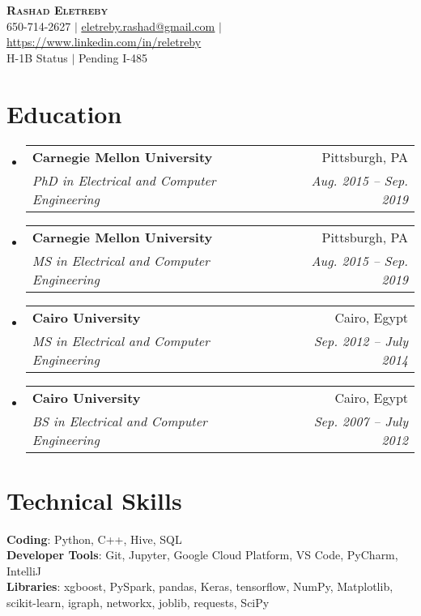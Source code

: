 \documentclass[letterpaper,11pt]{article}
\makeatletter
\newcommand{\resumeSubheading}[4]{
  \vspace{-2pt}\item
    \begin{tabular*}{0.97\textwidth}[t]{l@{\extracolsep{\fill}}r}
      \textbf{#1} & #2 \\
      \textit{\small#3} & \textit{\small #4} \\
    \end{tabular*}\vspace{-7pt}
}
\newcommand{\resumeSubHeadingListStart}{\begin{itemize}[leftmargin=0.15in, label={}]}
\newcommand{\resumeSubHeadingListEnd}{\end{itemize}}
\makeatother
\begin{document}

\begin{center}
    \textbf{\Huge \scshape Rashad Eletreby} \\ \vspace{1pt}
    \small 650-714-2627 $|$ \href{mailto:eletreby.rashad@gmail.com}{\underline{eletreby.rashad@gmail.com}} $|$ 
    \href{https://www.linkedin.com/in/reletreby}{\underline{https://www.linkedin.com/in/reletreby}} 
    \\ \vspace{1mm}
    \small H-1B Status $|$ Pending I-485
\end{center}


\section{Education}
  \resumeSubHeadingListStart
    \resumeSubheading
      {Carnegie Mellon University}{Pittsburgh, PA}
      {PhD in Electrical and Computer Engineering}{Aug. 2015 -- Sep. 2019}
      
     \vspace{1mm}
    \resumeSubheading
      {Carnegie Mellon University}{Pittsburgh, PA}
      {MS in Electrical and Computer Engineering}{Aug. 2015 -- Sep. 2019}
      
       \vspace{1mm}
    \resumeSubheading
      {Cairo University}{Cairo, Egypt}
      {MS in Electrical and Computer Engineering}{Sep. 2012 -- July 2014}
      
      \vspace{1mm}
    \resumeSubheading
      {Cairo University}{Cairo, Egypt}
      {BS in Electrical and Computer Engineering}{Sep. 2007 -- July 2012}
  \resumeSubHeadingListEnd


\vspace{1mm}
\section{Technical Skills}
 \begin{itemize}[leftmargin=0.15in, label={}]
    \small{\item{
     \textbf{Coding}{: Python, C++, Hive, SQL} \\
     \textbf{Developer Tools}{: Git, Jupyter, Google Cloud Platform, VS Code, PyCharm, IntelliJ} \\
     \textbf{Libraries}{: xgboost, PySpark, pandas, Keras, tensorflow, NumPy, Matplotlib, scikit-learn, igraph, networkx, joblib, requests, SciPy}
    }}
 \end{itemize}
 
\end{document}
